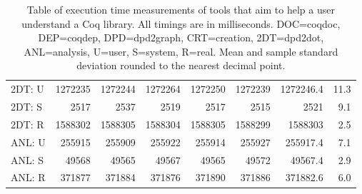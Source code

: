 \begin{table}[h]
\begin{tabular*}{\textwidth}{@{\extracolsep{\fill}} lrrrrrrr}
    2DT: U & 1272235 & 1272244 & 1272264 & 1272250 & 1272239 & 1272246.4 & 11.3 \\
    2DT: S & 2517    & 2537    & 2519    & 2517    & 2515    & 2521      & 9.1 \\
    2DT: R & 1588302 & 1588305 & 1588304 & 1588305 & 1588299 & 1588303   & 2.5 \\

    ANL: U & 255915  & 255909  & 255922  & 255914  & 255927  & 255917.4  & 7.1 \\
    ANL: S & 49568   & 49565   & 49567   & 49565   & 49572   & 49567.4   & 2.9 \\
    ANL: R & 371877  & 371884  & 371876  & 371890  & 371886  & 371882.6  & 6.0 \\

    \bottomrule

  \end{tabular*}
  \normalsize

  \bigskip 

  \caption{Table of execution time measurements of tools that aim to help a
    user understand a Coq library. All timings are in milliseconds. DOC=coqdoc,
    DEP=coqdep, DPD=dpd2graph, CRT=creation, 2DT=dpd2dot, ANL=analysis, U=user,
    S=system, R=real. Mean and sample standard deviation rounded to the nearest
    decimal point.}

\end{table}

